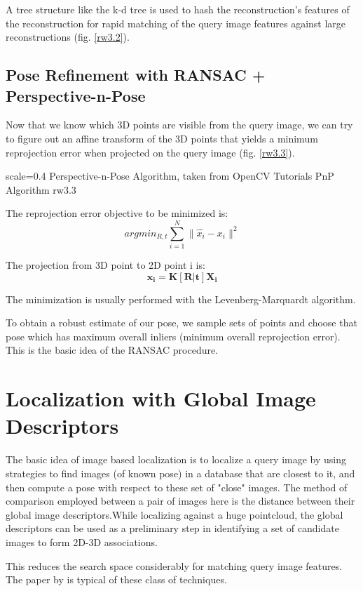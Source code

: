 A tree structure like the k-d tree is used to hash the reconstruction's features of the reconstruction for rapid matching of the query image features against large reconstructions (fig. \ref{rw3.2}).

\subsection{Pose Refinement with RANSAC + Perspective-n-Pose}
Now that we know which 3D points are visible from the query image, we can try to figure out an affine transform of the 3D points that yields a minimum reprojection error when projected on the query image (fig. \ref{rw3.3}). 

{scale=0.4}%
{Perspective-n-Pose Algorithm, taken from OpenCV Tutorials}%
{PnP Algorithm}%
{rw3.3} %

The reprojection error objective to be minimized is:
\[argmin_{R, t}\sum_{i=1}^{N}\|\hat{x_i} - x_i\|^2\]

The projection from 3D point to 2D point i is:
\[\mathbf{x_i} = \mathbf{K[R|t]X_i}\]

The minimization is usually performed with the Levenberg-Marquardt algorithm. 

To obtain a robust estimate of our pose, we sample sets of points and choose that pose which has maximum overall inliers (minimum overall reprojection error). This is the basic idea of the RANSAC procedure.

\section{Localization with Global Image Descriptors}
The basic idea of image based localization is to localize a query image by using strategies to find images (of known pose) in a database that are closest to it, and then compute a pose with respect to these set of "close" images. The method of comparison employed between a pair of images here is the distance between their global image descriptors.While localizing against a huge pointcloud, the global descriptors can be used as a preliminary step in identifying a set of candidate images to form 2D-3D associations. 

This reduces the search space considerably for matching query image features. The paper by \cite{Sattler2012} is typical of these class of techniques.

